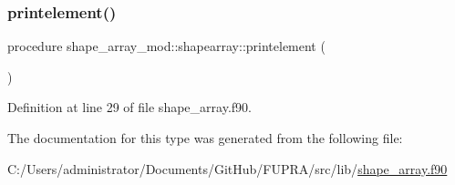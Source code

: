 \subsubsection{\texorpdfstring{printelement()}{printelement()}}
{\footnotesize\ttfamily procedure shape\+\_\+array\+\_\+mod\+::shapearray\+::printelement (\begin{DoxyParamCaption}{ }\end{DoxyParamCaption})\hspace{0.3cm}{\ttfamily [private]}}



Definition at line 29 of file shape\+\_\+array.\+f90.



The documentation for this type was generated from the following file\+:\begin{DoxyCompactItemize}
\item 
C\+:/\+Users/administrator/\+Documents/\+Git\+Hub/\+F\+U\+P\+R\+A/src/lib/\mbox{\hyperlink{shape__array_8f90}{shape\+\_\+array.\+f90}}\end{DoxyCompactItemize}
